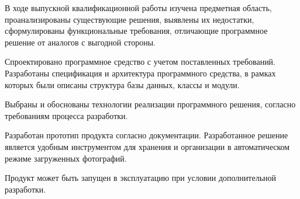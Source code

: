 \sectioncounter
{}

В ходе выпускной квалификационной работы изучена предметная область, проанализированы существующие решения, выявлены их недостатки, сформулированы функциональные требования, отличающие программное решение от аналогов с выгодной стороны.

Спроектировано программное средство с учетом поставленных требований.
Разработаны спецификация и архитектура программного средства, в рамках которых были описаны структура базы данных, классы и модули.

Выбраны и обоснованы технологии реализации программного решения, согласно требованиям процесса разработки.

Разработан прототип продукта согласно документации. 
Разработанное решение является удобным инструментом для хранения и организации в автоматическом режиме загруженных фотографий.

Продукт может быть запущен в эксплуатацию при условии дополнительной разработки.

\clearpage